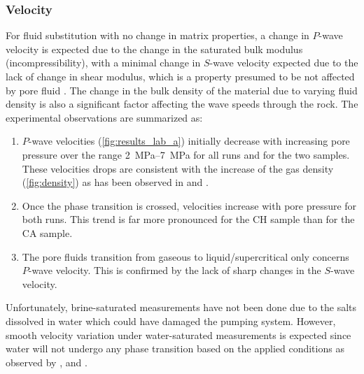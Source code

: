 \subsubsection{Velocity}
For fluid substitution with no change in matrix properties, a change in $P$-wave
velocity is expected due to the change in the saturated bulk modulus
(incompressibility), with a minimal change in $S$-wave velocity expected due to
the lack of change in shear modulus, which is a property presumed to be not
affected by pore fluid \citep{Daley2007}. The change in the bulk density of the
material due to varying  fluid density is also a significant factor
affecting the wave speeds through the rock. The experimental observations are
summarized as:
\begin{enumerate}[-]
\item $P$-wave velocities (\cref{fig:results_lab_a}) initially decrease with
increasing pore pressure over the range \SIrange{2}{7}{\mega\pascal} for all
runs and for the two samples. These velocities drops are consistent with the
increase of the  gas density (\cref{fig:density}) as has been observed
in \citep{Yam2011} and \citep{Chowdhury2014}.
\item Once the phase transition is crossed, velocities increase with pore
pressure for both runs. This trend is far more pronounced for the CH sample than
for the CA sample.
\item The pore fluids transition from gaseous  to liquid/supercritical
 only concerns $P$-wave velocity. This is confirmed by the lack of sharp
changes in the $S$-wave velocity.
\end{enumerate}
Unfortunately, brine-saturated measurements have not been done due to the salts
dissolved in water which could have damaged the pumping system. However, smooth
velocity variation under water-saturated measurements is expected since water
will not undergo any phase transition based on the applied conditions as
observed by \citet{Njiekak2013}, \citet{Yam2011} and \citet{Chowdhury2014}.
